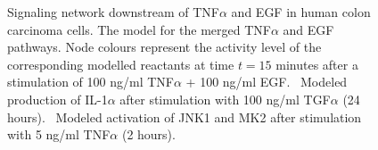 \begin{figure}[!htpb]
\caption{Signaling network downstream of TNF$\alpha$ and EGF in human colon carcinoma cells.
{\bf \protect{}}
The model for the merged TNF$\alpha$ and EGF pathways. Node colours represent the
activity level of the corresponding modelled reactants at time $t = 15$ minutes after
a stimulation of 100 ng/ml TNF$\alpha$ + 100 ng/ml EGF.
{\bf \protect{}}~Modeled production of IL-1$\alpha$ after stimulation with 100 ng/ml TGF$\alpha$ (24 hours).
{\bf \protect{}}~Modeled activation of JNK1 and MK2 after stimulation with 5 ng/ml TNF$\alpha$ (2 hours).
}\label{fig:large-model-all}
\end{figure}


